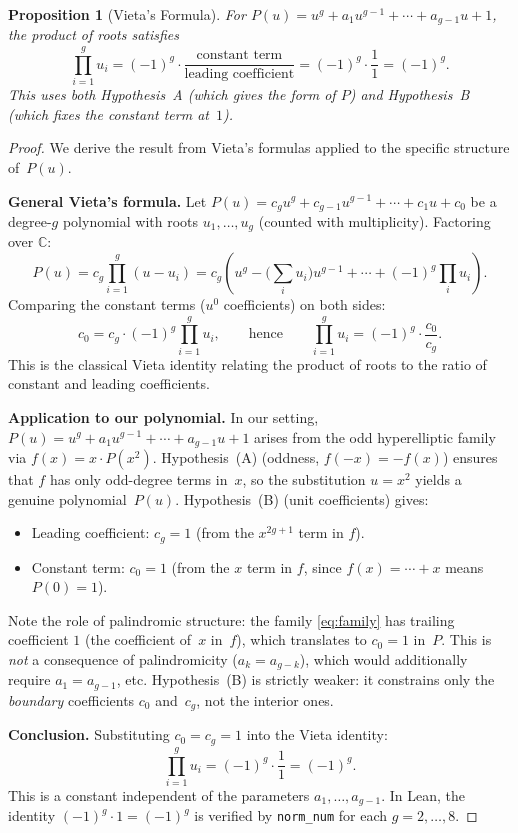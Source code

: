 \documentclass[11pt]{article}
\theoremstyle{plain}
\newtheorem{proposition}[theorem]{Proposition}
\theoremstyle{definition}
\theoremstyle{remark}
\newcommand{\CC}{\mathbb{C}}
\begin{document}
\begin{proposition}[Vieta's Formula]\label{prop:vieta}
  For $P(u) = u^g + a_1 u^{g-1} + \cdots + a_{g-1} u + 1$, the product of
  roots satisfies
  \[
    \prod_{i=1}^{g} u_i = (-1)^g \cdot \frac{\text{constant term}}{\text{leading coefficient}}
    = (-1)^g \cdot \frac{1}{1} = (-1)^g.
  \]
  This uses both Hypothesis~A (which gives the form of $P$) and Hypothesis~B
  (which fixes the constant term at~$1$).
\end{proposition}

\begin{proof}
  We derive the result from Vieta's formulas applied to the specific
  structure of~$P(u)$.

  \textbf{General Vieta's formula.}
  Let $P(u) = c_g u^g + c_{g-1}u^{g-1} + \cdots + c_1 u + c_0$ be a
  degree-$g$ polynomial with roots $u_1,\ldots,u_g$ (counted with multiplicity).
  Factoring over $\CC$:
  \[
    P(u) = c_g \prod_{i=1}^{g} (u - u_i)
    = c_g\!\left(u^g - \bigl(\textstyle\sum_i u_i\bigr) u^{g-1}
    + \cdots + (-1)^g \prod_i u_i\right).
  \]
  Comparing the constant terms ($u^0$ coefficients) on both sides:
  \[
    c_0 = c_g \cdot (-1)^g \prod_{i=1}^g u_i,
    \qquad\text{hence}\qquad
    \prod_{i=1}^g u_i = (-1)^g \cdot \frac{c_0}{c_g}.
  \]
  This is the classical Vieta identity relating the product of roots
  to the ratio of constant and leading coefficients.

  \textbf{Application to our polynomial.}
  In our setting, $P(u) = u^g + a_1 u^{g-1} + \cdots + a_{g-1} u + 1$
  arises from the odd hyperelliptic family via $f(x) = x\cdot P(x^2)$.
  Hypothesis~(A) (oddness, $f(-x) = -f(x)$) ensures that $f$ has only
  odd-degree terms in~$x$, so the substitution $u = x^2$ yields a genuine
  polynomial~$P(u)$.  Hypothesis~(B) (unit coefficients) gives:
  \begin{itemize}
    \item Leading coefficient: $c_g = 1$ (from the $x^{2g+1}$ term in $f$).
    \item Constant term: $c_0 = 1$ (from the $x$ term in $f$, since
      $f(x) = \cdots + x$ means $P(0) = 1$).
  \end{itemize}
  Note the role of palindromic structure: the family \eqref{eq:family}
  has trailing coefficient $1$ (the coefficient of~$x$ in~$f$), which
  translates to $c_0 = 1$ in~$P$.  This is \emph{not} a consequence of
  palindromicity ($a_k = a_{g-k}$), which would additionally require
  $a_1 = a_{g-1}$, etc.  Hypothesis~(B) is strictly weaker: it constrains
  only the \emph{boundary} coefficients $c_0$ and~$c_g$, not the interior ones.

  \textbf{Conclusion.}
  Substituting $c_0 = c_g = 1$ into the Vieta identity:
  \[
    \prod_{i=1}^g u_i = (-1)^g \cdot \frac{1}{1} = (-1)^g.
  \]
  This is a constant independent of the parameters $a_1,\ldots,a_{g-1}$.
  In Lean, the identity $(-1)^g \cdot 1 = (-1)^g$ is verified by
  \texttt{norm\_num} for each $g = 2,\ldots,8$.
\end{proof}
\end{document}
